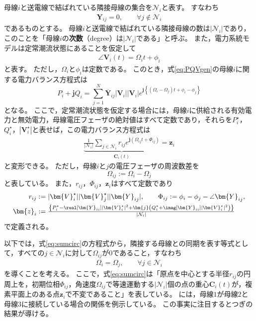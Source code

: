 \documentclass[tombow,dvipdfmx]{corona-a5-1.1}
\begin{document}
母線$i$と送電線で結ばれている隣接母線の集合を$\mathcal{N}_i$と表す。
すなわち
\begin{align*}
\bm{Y}_{ij} = 0,\qquad \forall j \notin \mathcal{N}_i
\end{align*}
であるものとする。
母線$i$と送電線で結ばれている隣接母線の数は$|\mathcal{N}_i|$であり，このことを「母線$i$の\textbf{次数}（degree）は$|\mathcal{N}_i|$である」と呼ぶ。
また，電力系統モデルは定常潮流状態にあることを仮定して
\begin{align*}
\angle \bm{V}_i (t) = \Omega_i t +\phi_i
\end{align*}
と表す。
ただし，$\Omega_i$と$\phi_i$は定数である。
このとき，式\ref{eq:PQVgen}の母線$i$に関する電力バランス方程式は
\[
P_i + \bm{j} Q_i = \sum_{j=1}^N \overline{\bm{Y}}_{ij} |\bm{V}_i| |\bm{V}_i|
e^{\bm{j} \left\{ ( \Omega_i - \Omega_j )t + \phi_i -\phi_j \right\}}
\]
となる。
ここで，定常潮流状態を仮定する場合には，母線$i$に供給される有効電力と無効電力，母線電圧フェーザの絶対値はすべて定数であり，それらを$P_i^{\star}$，$Q_i^{\star}$，$|\bm{V}_i^{\star}|$と表せば，この電力バランス方程式は
\begin{align}\label{eq:sumcirc}
\underbrace{
\frac{1}{|\mathcal{N}_i|}\sum_{j \in \mathcal{N}_i } 
r_{ij}
e^{\bm{j} 
\left(
\Omega_{ij}t + 
\Phi_{ij}
\right) }
}_{\bm{C}_i (t)}
= \bm{z}_i
\end{align}
と変形できる。
ただし，母線$i$と$j$の電圧フェーザの周波数差を
\[
\Omega_{ij}:=\Omega_{i}-\Omega_{j}
\]
と表している。
また，$r_{ij}$，$\Phi_{ij}$，$\bm{z}_i$はすべて定数であり
\begin{align*}
r_{ij} &:=|\bm{V}_i^{\star}| |\bm{V}_j^{\star}| |\bm{Y}_{ij}|, \qquad
\Phi_{ij} := \phi_i - \phi_j - \angle \bm{Y}_{ij},
\\
\bm{z}_i &:=  \tfrac{
\left\{
P_i^{\star} - \real[\bm{Y}_{ii}] |\bm{V}_i^{\star}|^2
+ \bm{j}
\left(
Q_i^{\star} + \imag [\bm{Y}_{ii}] |\bm{V}_i^{\star}|^2
\right)
\right\}
}
{|\mathcal{N}_i|}
\end{align*}
で定義される。

以下では，式\ref{eq:sumcirc}の方程式から，隣接する母線との同期を表す等式として，すべての$j\in \mathcal{N}_i$に対して$\Omega_{ij}$が0であること，すなわち
\begin{align}\label{eq:alloms}
\Omega_i = \Omega_{j} 
,\qquad 
\forall j\in \mathcal{N}_i
\end{align}
を導くことを考える。
ここで，式\ref{eq:sumcirc}は「原点を中心とする半径$r_{ij}$の円周上を，初期位相$\Phi_{ij}$，角速度$\Omega_{ij}$で等速運動する$|\mathcal{N}_i|$個の点の重心$\bm{C}_i (t)$が，複素平面上のある点$\bm{z}_i$で不変であること」を表している。
には，母線$1$が母線$2$と母線$3$に接続している場合の関係を例示している。
この事実に注目するとつぎの結果が導ける。
\end{document}
